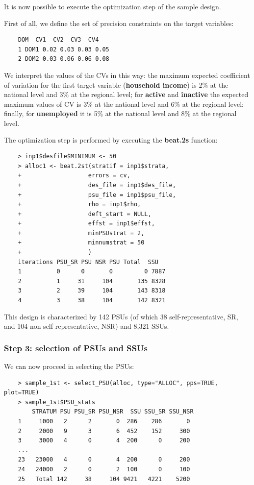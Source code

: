 It is now possible to execute the optimization step of the sample design. 

First of all, we define the set of precision constraints on the target variables:
\begin{verbatim}
	DOM  CV1  CV2  CV3  CV4
	1 DOM1 0.02 0.03 0.03 0.05
	2 DOM2 0.03 0.06 0.06 0.08
\end{verbatim}
We interpret the values of the CVs in this way: the maximum expected coefficient of variation for the first target variable (\textbf{household income}) is 2\% at the national level and 3\% at the regional level; for \textbf{active} and \textbf{inactive} the expected maximum values of CV is 3\% at the national level and 6\% at the regional level; finally, for \textbf{unemployed} it is 5\% at the national level and 8\% at the regional level.

The optimization step is performed by executing the \textbf{beat.2s} function:

\begin{verbatim}
	> inp1$desfile$MINIMUM <- 50
	> alloc1 <- beat.2st(stratif = inp1$strata, 
	+                   errors = cv, 
	+                   des_file = inp1$des_file, 
	+                   psu_file = inp1$psu_file, 
	+                   rho = inp1$rho, 
	+                   deft_start = NULL,
	+                   effst = inp1$effst, 
	+                   minPSUstrat = 2,
	+                   minnumstrat = 50
	+                   )
	iterations PSU_SR PSU NSR PSU Total  SSU
	1          0      0       0         0 7887
	2          1     31     104       135 8328
	3          2     39     104       143 8318
	4          3     38     104       142 8321
\end{verbatim}

This design is characterized by 142 PSUs (of which 38 self-representative, SR, and 104 non self-representative, NSR) and 8,321 SSUs. 


\subsubsection{Step 3: selection of PSUs and SSUs}

We can now proceed in selecting the PSUs:

\begin{verbatim}
	> sample_1st <- select_PSU(alloc, type="ALLOC", pps=TRUE, plot=TRUE)
	> sample_1st$PSU_stats
	    STRATUM PSU PSU_SR PSU_NSR  SSU SSU_SR SSU_NSR
	1     1000   2      2       0  286    286       0
	2     2000   9      3       6  452    152     300
	3     3000   4      0       4  200      0     200
	...
	23   23000   4      0       4  200      0     200
	24   24000   2      0       2  100      0     100
	25   Total 142     38     104 9421   4221    5200
\end{verbatim}

